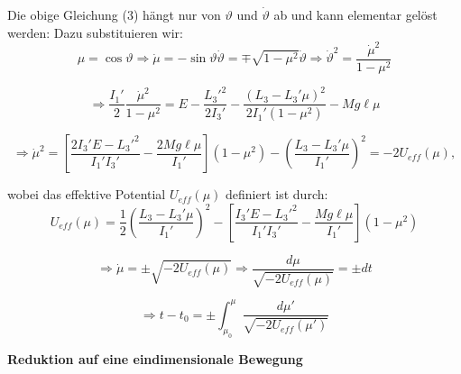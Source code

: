 \documentclass[10pt, letterpaper]{article}
\begin{document}
Die obige Gleichung (3) hängt nur von $\vartheta$ und $\dot{\vartheta}$ ab und kann elementar gelöst werden: Dazu substituieren wir:
\[
\mu = \cos\vartheta \Rightarrow \dot{\mu} = -\sin\vartheta\dot{\vartheta} = \mp\sqrt{1-\mu^2}\dot{\vartheta} \Rightarrow \dot{\vartheta}^2 = \frac{\dot{\mu}^2}{1-\mu^2}
\]

\[
\Rightarrow \frac{I_1'}{2}\frac{\dot{\mu}^2}{1-\mu^2} = E - \frac{L_3'^2}{2I_3'} - \frac{(L_3-L_3'\mu)^2}{2I_1'(1-\mu^2)} - Mg\ell\mu
\]

\[
\Rightarrow \dot{\mu}^2 = \left[\frac{2I_3'E-L_3'^2}{I_1'I_3'} - \frac{2Mg\ell\mu}{I_1'}\right](1-\mu^2) - \left(\frac{L_3-L_3'\mu}{I_1'}\right)^2 = -2U_{eff}(\mu),
\]

wobei das effektive Potential $U_{eff}(\mu)$ definiert ist durch:
\[U_{eff}(\mu) = \frac{1}{2}\left(\frac{L_3-L_3'\mu}{I_1'}\right)^2 - \left[\frac{I_3'E-L_3'^2}{I_1'I_3'} - \frac{Mg\ell\mu}{I_1'}\right](1-\mu^2)\]

\[\Rightarrow \dot{\mu} = \pm\sqrt{-2U_{eff}(\mu)} \Rightarrow \frac{d\mu}{\sqrt{-2U_{eff}(\mu)}} = \pm dt\]

\[\Rightarrow t-t_0 = \pm \int_{\mu_0}^{\mu} \frac{d\mu'}{\sqrt{-2U_{eff}(\mu')}}\]



\textbf{Reduktion auf eine eindimensionale Bewegung}
\end{document}

